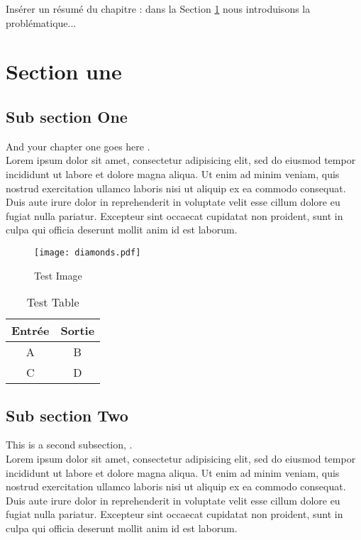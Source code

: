 

Insérer un résumé du chapitre : dans la Section \ref{chap:sectionone} nous introduisons la problématique...

\section{Section une}
\label{chap:sectionone}

\subsection{Sub section One}

And your chapter one goes here \cite{web001,Nom2012}. \\
  Lorem ipsum dolor sit amet, consectetur adipisicing elit, sed do eiusmod
  tempor incididunt ut labore et dolore magna aliqua. Ut enim ad minim veniam, quis nostrud exercitation ullamco laboris nisi ut aliquip ex ea commodo consequat. Duis aute irure dolor in reprehenderit in voluptate velit esse \cite{Bird02nltk:the}
  cillum dolore eu fugiat nulla pariatur. Excepteur sint occaecat cupidatat non
  proident, sunt in culpa qui officia deserunt mollit anim id est laborum.

  \begin{figure}[h]%
    \center%
    \texttt{[image: diamonds.pdf]}
    \caption[This is a test image]{Test Image}\label{fig:test}%
  \end{figure}


\begin{table}\begin{center}
\begin{tabular}{c|c}
Entrée & Sortie \\ \hline 
A & B \\
C & D
\end{tabular}
\caption{Test Table}\end{center}
\end{table}


\subsection{Sub section Two}

  This is a second subsection\cite{gen1972}, \cite{schaeffer99}. ~\\
  Lorem ipsum dolor sit amet, consectetur adipisicing elit, sed do eiusmod
  tempor incididunt ut labore et dolore magna aliqua. Ut enim ad minim veniam,
  quis nostrud exercitation ullamco laboris nisi ut aliquip ex ea commodo
  consequat. Duis aute irure dolor in reprehenderit in voluptate velit esse
  cillum dolore eu fugiat nulla pariatur. Excepteur sint occaecat cupidatat non
  proident, sunt in culpa qui officia deserunt mollit anim id est laborum.

